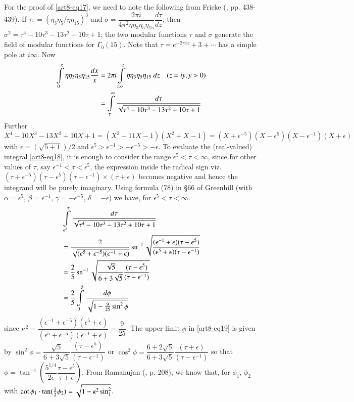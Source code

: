 For the proof of \eqref{art8-eq17}, we need to note the following from Fricke (\cite{art8-key3}, pp. 438-439). If $\tau : = (\eta_{3}\eta_{5}/\eta\eta_{15})^{3}$ and $\sigma = \dfrac{2\pi i}{4\pi^{2}\eta\eta_{3}\eta_{5}\eta_{15}}\dfrac{d\tau}{dz}$, then $\sigma^{2}=\tau^{4}-10\tau^{3}-13\tau^{2}+10\tau+1$; the two modular functions $\tau$ and $\sigma$ generate the field of modular functions for $\Gamma_{0}(15)$. Note that $\tau=e^{-2\pi iz}+3+\cdots$ has a simple pole at $i\infty$. Now
\setcounter{equation}{17}
\begin{align}
\int\limits^{x}_{0}\eta\eta_{3}\eta_{5}\eta_{15}\dfrac{dx}{x} &=2\pi i \int\limits^{z}_{i\infty}\eta\eta_{3}\eta_{5}\eta_{15} \ dz \quad (z=iy, y>0)\notag\\
&= \int\limits^{\infty}_{\tau}\dfrac{d\tau}{\sqrt{\tau^{4}-10\tau^{3}-13\tau^{2}+10\tau+1}}\label{art8-eq18}
\end{align}\pageoriginale
Further $X^{4}-10X^{3}-13X^{2}+10X+1=(X^{2}-11X-1)(X^{2}+X-1)=(X+\epsilon^{-5})(X-\epsilon^{5})(X-\epsilon^{-1})(X+\epsilon)$ with $\epsilon=(\sqrt{5+1})/2$ and $\epsilon^{5}>\epsilon^{-1}>-\epsilon^{-5}>-\epsilon$. To evaluate the (real-valued) integral \eqref{art8-eq18}, it is enough to consider the range $\epsilon^{5}<\tau<\infty$, since for other values of $\tau$, say $\epsilon^{-1}<\tau<\epsilon^{5}$, the expression inside the radical sign viz. $(\tau+\epsilon^{-5})(\tau-\epsilon^{5})(\tau-\epsilon^{-1})\times (\tau+\epsilon)$ becomes negative and hence the integrand will be purely imaginary. Using formula (78) in \S66 of Greenhill \cite{art8-key4} (with $\alpha=\epsilon^{5}$, $\beta=\epsilon^{-1}$, $\gamma=-\epsilon^{-5}$, $\delta=-\epsilon$) we have, for $\epsilon^{5}<\tau<\infty$.
\begin{align}
& \int\limits^{\tau}_{\epsilon^{5}}\frac{d\tau}{\sqrt{\tau^{4}-10\tau^{3}-13\tau^{2}+10\tau+1}}\notag\\
&= \frac{2}{\sqrt{(\epsilon^{5}+\epsilon^{-5})(\epsilon^{-1}+\epsilon)}}\operatorname{sn}^{-1}\sqrt{\dfrac{(\epsilon^{-1}+\epsilon)(\tau-\epsilon^{5})}{(\epsilon^{5}+\epsilon)(\tau-\epsilon^{-1})}}\notag\\
&= \frac{2}{5}\operatorname{sn}^{-1}\sqrt{\frac{\sqrt{5}}{6+3\sqrt{5}}\dfrac{(\tau-\epsilon^{5})}{(\tau-\epsilon^{-1})}}\notag\\
&= \frac{2}{5}\int\limits^{\phi}_{0}\dfrac{d\phi}{\sqrt{1-\frac{9}{25}\sin^{2}\phi}}\label{art8-eq19}
\end{align}
since $\kappa^{2}=\dfrac{(\epsilon^{-1}+\epsilon^{-5})(\epsilon^{5}+\epsilon)}{(\epsilon^{5}+\epsilon^{-5})(\epsilon^{-1}+\epsilon)}=\dfrac{9}{25}$. The upper limit $\phi$ in \eqref{art8-eq19} is given by $\sin^{2}\phi = \dfrac{\sqrt{5}}{6+3\sqrt{5}}\dfrac{(\tau-\epsilon^{5})}{(\tau-\epsilon^{-1})}$ or $\cos^{2}\phi = \dfrac{6+2\sqrt{5}}{6+3\sqrt{5}}\dfrac{(\tau+\epsilon)}{(\tau-\epsilon^{-1})}$ so that $\phi =\tan^{-1}\left(\dfrac{5^{1/4}}{2\epsilon}\dfrac{\tau-\epsilon^{5}}{\tau+\epsilon}\right)$. From Ramanujan (\cite{art8-key10}, p. 208), we know that, for $\phi_{1}$, $\phi_{2}$ with $\cot \phi_{1}\cdot \tan (\frac{1}{2}\phi_{2})=\sqrt{1-\kappa^{2}\sin^{2}\empty_{1}}$.
